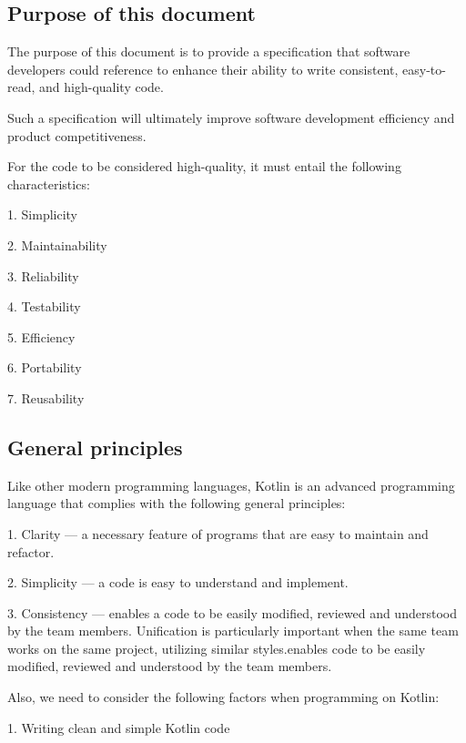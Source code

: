 \subsection*{\textbf{Purpose of this document}}



The purpose of this document is to provide a specification that software developers could reference to enhance their ability to write consistent, easy-to-read, and high-quality code.

Such a specification will ultimately improve software development efficiency and product competitiveness.

For the code to be considered high-quality, it must entail the following characteristics:

1.	Simplicity

2.	Maintainability

3.	Reliability

4.	Testability

5.	Efficiency

6.	Portability

7.	Reusability





\subsection*{\textbf{General principles}}



Like other modern programming languages, Kotlin is an advanced programming language that complies with the following general principles:

1.	Clarity — a necessary feature of programs that are easy to maintain and refactor.

2.	Simplicity — a code is easy to understand and implement.

3.	Consistency — enables a code to be easily modified, reviewed and understood by the team members. Unification is particularly important when the same team works on the same project, utilizing similar styles.enables code to be easily modified, reviewed and understood by the team members.



Also, we need to consider the following factors when programming on Kotlin:



1. Writing clean and simple Kotlin code



